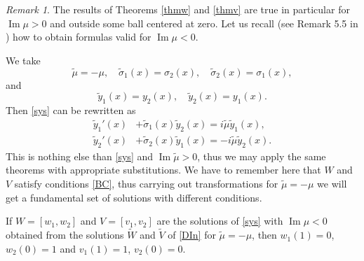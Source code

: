 \documentclass[11pt]{amsart}
\theoremstyle{plain}
\theoremstyle{definition}
\theoremstyle{remark}
\newtheorem{rem}[thm]{Remark}
\numberwithin{equation}{section}
\renewcommand\Im{\operatorname{Im}}
\begin{document}
\begin{rem}\label{remNeg}
The results of Theorems \ref{thmw} and \ref{thmv} are true in particular for $\Im\mu > 0 $
and outside some ball centered at zero. Let us recall (see Remark 5.5 in \cite{Rzep25}) how
to obtain formulas valid for $\Im \mu < 0$.

We take
\[
\tilde{\mu}=-\mu, \quad \tilde{\sigma}_1(x)=\sigma_2(x),\quad \tilde{\sigma}_2(x)=\sigma_1(x),
\]
and
\[
\tilde{y}_1(x)=y_2(x),\quad \tilde{y}_2(x)=y_1(x).
\]
Then \eqref{sys} can be rewritten as
\begin{align}\label{DIn}
\tilde{y}_1'(x)&+\tilde{\sigma}_1(x)\tilde{y}_2(x)=i\tilde{\mu}\tilde{y}_1(x),\\
\tilde{y}_2'(x)&+\tilde{\sigma}_2(x)\tilde{y}_1(x)=-i\tilde{\mu} \tilde{y}_2(x).\nonumber
\end{align}
This is nothing else than \eqref{sys} and $\Im \tilde{\mu} >0$, thus we may apply the same theorems with
appropriate substitutions. We have to remember here that $W$ and $V$ satisfy conditions
\eqref{BC}, thus
carrying out transformations for $\tilde{\mu}=-\mu$ we will get a fundamental
set of solutions with different conditions.

If $W=[w_1,w_2]$ and $V=[v_1,v_2]$ are the solutions of \eqref{sys} with $\Im \mu <0$
obtained from the solutions $\widetilde{W}$ and $\widetilde{V}$ of \eqref{DIn} for $\tilde{\mu}=-\mu$, then
 $w_1(1)=0$, $w_2(0)=1$ and $v_1(1)=1$, $v_2(0)=0$.
\end{rem}
\end{document}
